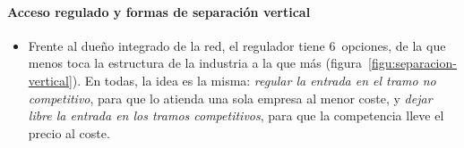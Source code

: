 \documentclass[11pt]{article}
\begin{document}
\paragraph{Acceso regulado y formas de separación vertical}

\begin{itemize}
\item Frente al dueño integrado de la red, el regulador tiene 6~opciones, de la que menos toca la estructura de la industria a la que más\nocite{OCDE2001Restructuring} (figura~\ref{figu:separacion-vertical}). En todas, la idea es la misma: \emph{regular la entrada en el tramo no competitivo}, para que lo atienda una sola empresa al menor coste, y \emph{dejar libre la entrada en los tramos competitivos}, para que la competencia lleve el precio al coste.
\end{itemize}

\begin{infografia}[H]
\centering
\caption{Acceso regulado y formas de separación vertical: ANC, activo no competitivo (la red); AC, actividad competitiva}\label{figu:separacion-vertical}
\end{infografia}
\end{document}
